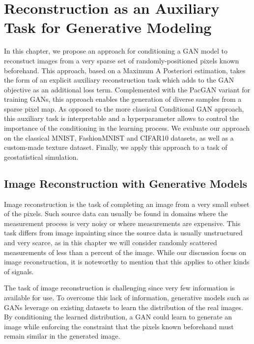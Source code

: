\chapter{Reconstruction as an Auxiliary Task for Generative Modeling}
\label{chap:chapter2}

\begin{chapterabstract}
	In this chapter, we propose an approach for conditioning a GAN model to reconstuct images from a very sparse set of randomly-positioned pixels known beforehand. This approach, based on a Maximum A Posteriori estimation, takes the form of an explicit auxiliary reconstruction task which adds to the GAN objective as an additional loss term. Complemented with the PacGAN variant for training GANs, this approach enables the generation of diverse samples from a sparse pixel map. As opposed to the more classical Conditional GAN approach, this auxiliary task is interpretable and a hyperparameter allows to control the importance of the conditioning in the learning process. We evaluate our approach on the classical MNIST, FashionMNIST and CIFAR10 datasets, as well as a custom-made texture dataset. Finally,  we apply this approach to a task of geostatistical simulation.
\end{chapterabstract}

 \section{Image Reconstruction with Generative Models}

Image reconstruction is the task of completing an image from a very small subset of the pixels. Such source data can usually be found in domains where the measurement process is very noisy or where measurements are expensive. This task differs from image inpainting since the source data is usually unstructured and very scarce, as in this chapter we will consider randomly scattered measurements of less than a percent of the image. While our discussion focus on image reconstruction, it is noteworthy to mention that this applies to other kinds of signals.

The task of image reconstruction is challenging since very few information is available for use. To overcome this lack of information, generative models such as GANs leverage on existing datasets to learn the distribution of the real images. By conditioning the learned distribution, a GAN could learn to generate an image while enforcing the constraint that the pixels known beforehand must remain similar in the generated image.

